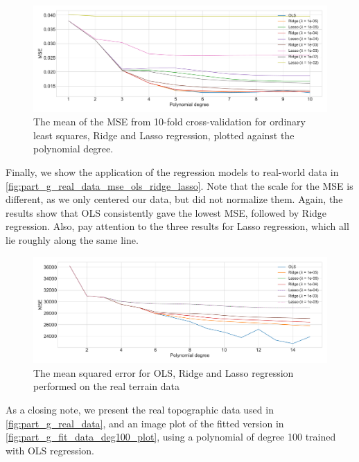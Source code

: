 \documentclass[12pt]{article}
\begin{document}
\begin{figure}
    \centering
    \includegraphics[width=1\linewidth]{images/part_f_MSE_10fold_crossval_ols_ridge_lasso.pdf}
    \caption{The mean of the MSE from 10-fold cross-validation for ordinary least squares, Ridge and Lasso regression, plotted against the polynomial degree.}
    \label{fig:part_f_MSE_10fold_crossval_ols_ridge_lasso}
\end{figure}

Finally, we show the application of the regression models to real-world data in \autoref{fig:part_g_real_data_mse_ols_ridge_lasso}. Note that the scale for the MSE is different, as we only centered our data, but did not normalize them. Again, the results show that OLS consistently gave the lowest MSE, followed by Ridge regression. Also, pay attention to the three results for Lasso regression, which all lie roughly along the same line. 

\begin{figure}
    \centering
    \includegraphics[width=1\linewidth]{images/part_g_real_data_mse_ols_ridge_lasso.pdf}
    \caption{The mean squared error for OLS, Ridge and Lasso regression performed on the real terrain data}
    \label{fig:part_g_real_data_mse_ols_ridge_lasso}
\end{figure}

As a closing note, we present the real topographic data used in \autoref{fig:part_g_real_data}, and an image plot of the fitted version in \autoref{fig:part_g_fit_data_deg100_plot}, using a polynomial of degree 100 trained with OLS regression.  
\end{document}
